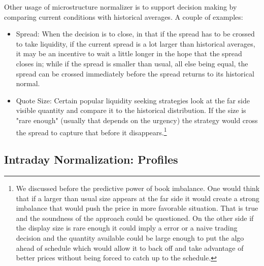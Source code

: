 Other usage of microstructure normalizer is to support decision making by comparing current conditions with historical averages. A couple of examples:
        \begin{itemize}
        \item Spread: When the decision is to close, in that if the spread has to be crossed to take liquidity, if the current spread is a lot larger than historical averages, it may be an incentive to wait a little longer in the hope that the spread closes in; while if the spread is smaller than usual, all else being equal, the spread can be crossed immediately before the spread returns to its historical normal.
        \item Quote Size: Certain popular liquidity seeking strategies look at the far side visible quantity and compare it to the historical distribution. If the size is "rare enough" (usually that depends on the urgency) the strategy would  cross the spread to capture that before it disappears.\footnote{We discussed before the predictive power of book imbalance. One would think that if a larger than usual size appears at the far side it would create a strong imbalance that would push the price in more favorable situation. That is true and the soundness of the approach could be questioned. On the other side if the display size is rare enough it could imply a error or a naive trading decision and the quantity available could be large enough to put the algo ahead of schedule which would allow it to back off and take advantage of better prices without being forced to catch up to the schedule. }
        \end{itemize}



\subsection{Intraday Normalization: Profiles}

